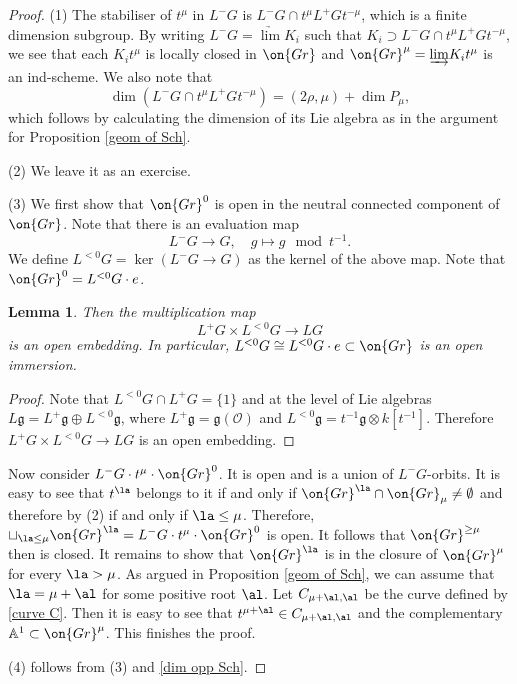\documentclass[]{pcmi}
\theoremstyle{plain}
\newtheorem{lem}[equation]{Lemma}
\theoremstyle{remark}
\theoremstyle{definition}
\newcommand{\frakg}{{\mathfrak g}}
\newcommand{\bA}{{\mathbb A}}
\newcommand{\mO}{{\mathcal O}}
\newcommand{\Gr}{{\on{Gr}}}
\begin{document}
\begin{proof}
(1) The stabiliser of $t^\mu$ in $L^-G$ is $L^-G\cap t^\mu L^+G t^{-\mu}$, which is a finite dimension subgroup. By writing $L^-G=\underrightarrow\lim K_i$ such that $K_i\supset L^-G\cap t^\mu L^+G t^{-\mu}$, we see that each $K_it^\mu$ is locally closed in $\Gr$ and $\Gr^\mu=\underrightarrow\lim K_it^\mu$ is an ind-scheme. We also note that 
\begin{equation}\label{dim opp Sch}
\dim(L^-G\cap t^\mu L^+G t^{-\mu})=(2\rho,\mu)+\dim P_\mu,
\end{equation} 
which follows by calculating the dimension of its Lie algebra as in the argument for Proposition \ref{geom of Sch}.

(2) We leave it as an exercise.

(3) We first show that $\Gr^0$ is open in the neutral connected component of $\Gr$. Note that there is an evaluation map
\[L^-G\to G,\quad g\mapsto g\mod t^{-1}.\]
We define $L^{<0}G=\ker(L^-G\to G)$ as the kernel of the above map. Note that $\Gr^0= L^{<0}G\cdot e$.
\begin{lem}\label{big cell}
Then the multiplication map
\[L^{+}G\times L^{<0}G\to LG\]
is an open embedding. In particular, $L^{<0}G\cong L^{<0}G\cdot e\subset \Gr$ is an open immersion.
\end{lem}
\begin{proof}Note that $L^{<0}G\cap L^+G=\{1\}$ and at the level of Lie algebras $L\frakg=L^+\frakg\oplus L^{<0}\frakg$, where $L^+\frakg=\frakg(\mO)$ and $L^{<0}\frakg=t^{-1}\frakg\otimes k[t^{-1}]$.
Therefore $L^{+}G\times L^{<0}G\to LG$ is an open embedding. 
\end{proof}
Now consider $L^-G\cdot t^\mu\cdot \Gr^0$. It is open and is a union of $L^-G$-orbits. It is easy to see that $t^\la$ belongs to it  if and only if $\Gr^\la\cap \Gr_\mu\neq \emptyset$ and therefore by (2) if and only if $\la\leq \mu$. Therefore, $\sqcup_{\la\leq \mu}\Gr^\la=L^-G\cdot t^\mu \cdot \Gr^0$ is open. It follows that $\Gr^{\geq \mu}$ then is closed. It remains to show that $\Gr^\la$ is in the closure of $\Gr^\mu$ for every $\la>\mu$. As argued in Proposition \ref{geom of Sch}, we can assume that $\la=\mu+\al$ for some positive root $\al$. Let $C_{\mu+\al,\al}$ be the curve defined by \eqref{curve C}. Then it is easy to see that $t^{\mu+\al}\in C_{\mu+\al,\al}$ and the complementary $\bA^1\subset \Gr^\mu$. This finishes the proof.

(4) follows from (3) and \eqref{dim opp Sch}.
\end{proof}
\end{document}
